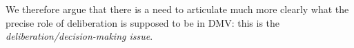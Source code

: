 \documentclass[version=3.21, pagesize, twoside=off, bibliography=totoc, DIV=calc, fontsize=12pt, a4paper, french, english]{scrartcl}
\begin{document}


We therefore argue that there is a need to articulate much more clearly what the precise role of deliberation is supposed to be in DMV: this is the \emph{deliberation/decision-making issue}.
\end{document}
